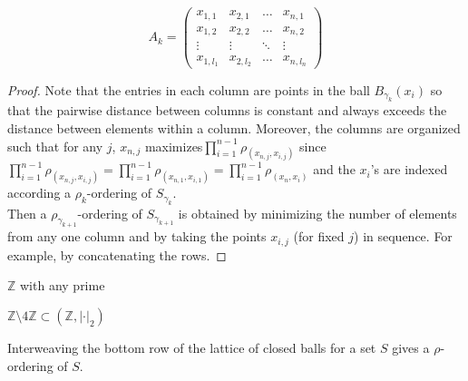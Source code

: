 \[A_k=
 \begin{pmatrix}
  x_{1,1} & x_{2,1} & \ldots  &x_{n,1} \\
  x_{1,2} & x_{2,2} &\ldots &x_{n,2} \\
  \vdots & \vdots & \ddots & \vdots \\
  x_{1,l_1} & x_{2,l_2} & \ldots &x_{n,l_n}
 \end{pmatrix}
\]


\begin{proof}
Note that the entries in each column are points in the ball $B_{\gamma_k}(x_i)$ so that the pairwise distance between columns is constant and always exceeds the distance between elements within a column. Moreover, the columns are organized such that for any $j$, $x_{n,j}$ maximizes$\prod_{i=1}^{n-1} \rho_(x_{n,j},x_{i,j})$ since $\prod_{i=1}^{n-1} \rho_(x_{n,j},x_{i,j}) = \prod_{i=1}^{n-1} \rho_(x_{n,1},x_{i,1}) = \prod_{i=1}^{n-1} \rho_(x_{n},x_{i})$ and the $x_i$'s are indexed according a $\rho_k$-ordering of $S_{\gamma_k}$.\\

Then a $\rho_{\gamma_{k+1}}$-ordering of $S_{\gamma_{k+1}}$ is obtained by minimizing the number of elements from any one column and by taking the points $x_{i,j}$ (for fixed $j$) in sequence. For example, by concatenating the rows.
\end{proof}

\begin{example}
$\mathbb{Z}$ with any prime
\end{example}

\begin{example}
$\mathbb{Z} \setminus 4\mathbb{Z} \subset (\mathbb{Z}, \lvert \cdot \rvert_2)$
\end{example}


\begin{corollary*}
Interweaving the bottom row of the lattice of closed balls for a set $S$ gives a $\rho$-ordering of $S$. 
\end{corollary*}


